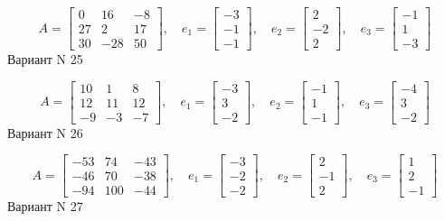 \documentclass[11pt]{report}
\begin{document}
$$A = \left[\begin{matrix}0 & 16 & -8\\27 & 2 & 17\\30 & -28 & 50\end{matrix}\right],\quad e_1 = \left[\begin{matrix}-3\\-1\\-1\end{matrix}\right],\quad e_2 = \left[\begin{matrix}2\\-2\\2\end{matrix}\right],\quad e_3 = \left[\begin{matrix}-1\\1\\-3\end{matrix}\right]$$Вариант N 25

$$A = \left[\begin{matrix}10 & 1 & 8\\12 & 11 & 12\\-9 & -3 & -7\end{matrix}\right],\quad e_1 = \left[\begin{matrix}-3\\3\\-2\end{matrix}\right],\quad e_2 = \left[\begin{matrix}-1\\1\\-1\end{matrix}\right],\quad e_3 = \left[\begin{matrix}-4\\3\\-2\end{matrix}\right]$$Вариант N 26

$$A = \left[\begin{matrix}-53 & 74 & -43\\-46 & 70 & -38\\-94 & 100 & -44\end{matrix}\right],\quad e_1 = \left[\begin{matrix}-3\\-2\\-2\end{matrix}\right],\quad e_2 = \left[\begin{matrix}2\\-1\\2\end{matrix}\right],\quad e_3 = \left[\begin{matrix}1\\2\\-1\end{matrix}\right]$$Вариант N 27
\end{document}
